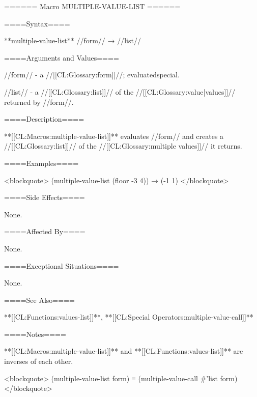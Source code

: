 ====== Macro MULTIPLE-VALUE-LIST ======

====Syntax====

**multiple-value-list** //form// → //list//

====Arguments and Values====

//form// - a //[[CL:Glossary:form]]//; evaluatedspecial.

//list// - a //[[CL:Glossary:list]]// of the //[[CL:Glossary:value|values]]// returned by //form//.

====Description====

**[[CL:Macros:multiple-value-list]]** evaluates //form// and creates a //[[CL:Glossary:list]]// of the //[[CL:Glossary:multiple values]]// it returns.

====Examples====

<blockquote> (multiple-value-list (floor -3 4)) → (-1 1) </blockquote>

====Side Effects====

None.

====Affected By====

None.

====Exceptional Situations====

None.

====See Also====

**[[CL:Functions:values-list]]**, **[[CL:Special Operators:multiple-value-call]]**

====Notes====

**[[CL:Macros:multiple-value-list]]** and **[[CL:Functions:values-list]]** are inverses of each other.

<blockquote> (multiple-value-list form) ≡ (multiple-value-call #'list form) </blockquote>

